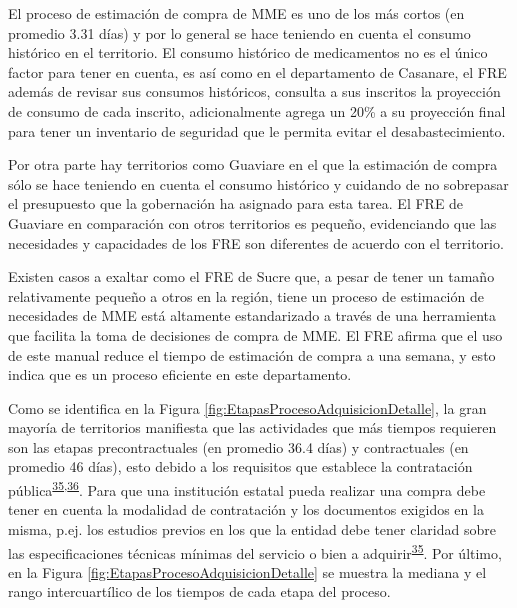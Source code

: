 \documentclass[
]{book}
\begin{document}
El proceso de estimación de compra de MME es uno de los más cortos (en promedio 3.31 días) y por lo general se hace teniendo en cuenta el consumo histórico en el territorio. El consumo histórico de medicamentos no es el único factor para tener en cuenta, es así como en el departamento de Casanare, el FRE además de revisar sus consumos históricos, consulta a sus inscritos la proyección de consumo de cada inscrito, adicionalmente agrega un 20\% a su proyección final para tener un inventario de seguridad que le permita evitar el desabastecimiento.

Por otra parte hay territorios como Guaviare en el que la estimación de compra sólo se hace teniendo en cuenta el consumo histórico y cuidando de no sobrepasar el presupuesto que la gobernación ha asignado para esta tarea. El FRE de Guaviare en comparación con otros territorios es pequeño, evidenciando que las necesidades y capacidades de los FRE son diferentes de acuerdo con el territorio.

Existen casos a exaltar como el FRE de Sucre que, a pesar de tener un tamaño relativamente pequeño a otros en la región, tiene un proceso de estimación de necesidades de MME está altamente estandarizado a través de una herramienta que facilita la toma de decisiones de compra de MME. El FRE afirma que el uso de este manual reduce el tiempo de estimación de compra a una semana, y esto indica que es un proceso eficiente en este departamento.

Como se identifica en la Figura \ref{fig:EtapasProcesoAdquisicionDetalle}, la gran mayoría de territorios manifiesta que las actividades que más tiempos requieren son las etapas precontractuales (en promedio 36.4 días) y contractuales (en promedio 46 días), esto debido a los requisitos que establece la contratación pública\textsuperscript{\protect\hyperlink{ref-CongresodelaRepublicadeColombia1993}{35},\protect\hyperlink{ref-CongresodelaRepublicadeColombia2007}{36}}. Para que una institución estatal pueda realizar una compra debe tener en cuenta la modalidad de contratación y los documentos exigidos en la misma, p.ej. los estudios previos en los que la entidad debe tener claridad sobre las especificaciones técnicas mínimas del servicio o bien a adquirir\textsuperscript{\protect\hyperlink{ref-CongresodelaRepublicadeColombia1993}{35}}. Por último, en la Figura \ref{fig:EtapasProcesoAdquisicionDetalle} se muestra la mediana y el rango intercuartílico de los tiempos de cada etapa del proceso.
\end{document}
